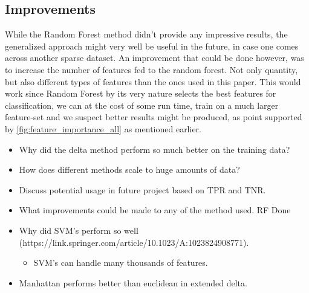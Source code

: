 \subsection{Improvements} 

While the Random Forest method didn't provide any
impressive results, the generalized approach might very well be useful in the
future, in case one comes across another sparse dataset. An improvement that
could be done however, was to increase the number of features fed to the random
forest. Not only quantity, but also different types of features than the ones
used in this paper. This would work since Random Forest by its very nature
selects the best features for classification, we can at the cost of some run
time, train on a much larger feature-set and we suspect better results might be
produced, as point supported by \ref{fig:feature_importance_all} as mentioned
earlier.

\begin{itemize}
    \item Why did the delta method perform so much better on the training data?
    \item How does different methods scale to huge amounts of data?
    \item Discuss potential usage in future project based on TPR and TNR.
    \item What improvements could be made to any of the method used. RF Done
    \item Why did SVM's perform so well (https://link.springer.com/article/10.1023/A:1023824908771).
        \begin{itemize}
            \item SVM's can handle many thousands of features.
        \end{itemize}
    \item Manhattan performs better than euclidean in extended delta.
\end{itemize}
